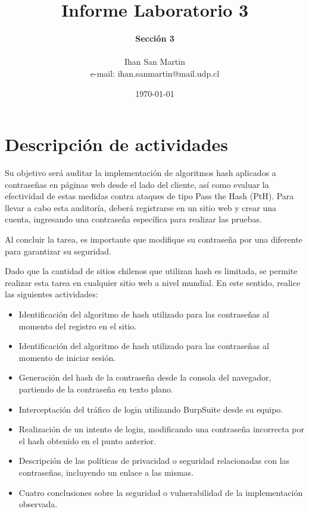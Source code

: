 \documentclass[letter,12pt]{article}
\begin{document}
%
   \title{\Huge{Informe Laboratorio 3}}

   \author{\textbf{Sección 3} \\  \\Ihan San Martin \\ e-mail: ihan.sanmartin@mail.udp.cl}
          
   \date{\today}

   \maketitle
   
   \tableofcontents
 
  \newpage
  

\section{Descripción de actividades}
Su objetivo será auditar la implementación de algoritmos hash aplicados a contraseñas en páginas web desde el lado del cliente, así como evaluar la efectividad de estas medidas contra ataques de tipo Pass the Hash (PtH). Para llevar a cabo esta auditoría, deberá registrarse en un sitio web y crear una cuenta, ingresando una contraseña específica para realizar las pruebas.\par

Al concluir la tarea, es importante que modifique su contraseña por una diferente para garantizar su seguridad.\par

Dado que la cantidad de sitios chilenos que utilizan hash es limitada, se permite realizar esta tarea en cualquier sitio web a nivel mundial. En este sentido, realice las siguientes actividades:


\begin{itemize}
    \item Identificación del algoritmo de hash utilizado para las contraseñas al momento del registro en el sitio.
    
    \item Identificación del algoritmo de hash utilizado para las contraseñas al momento de iniciar sesión.

    \item Generación del hash de la contraseña desde la consola del navegador, partiendo de la contraseña en texto plano.

    \item Interceptación del tráfico de login utilizando BurpSuite desde su equipo.

    \item Realización de un intento de login, modificando una contraseña incorrecta por el hash obtenido en el punto anterior.

    \item Descripción de las políticas de privacidad o seguridad relacionadas con las contraseñas, incluyendo un enlace a las mismas.

    \item Cuatro conclusiones sobre la seguridad o vulnerabilidad de la implementación observada.
    


    
\end{itemize}
\end{document}
